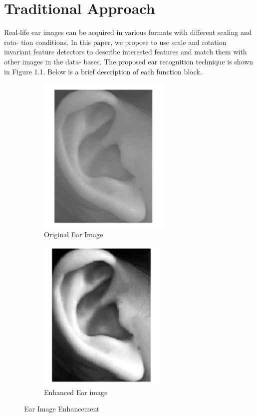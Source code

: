 \section{Traditional Approach} 
Real-life ear images can be acquired in various formats with different scaling and rota- tion conditions. In this paper, we propose to use scale and rotation invariant feature detectors to describe interested features and match them with other images in the data- bases. The proposed ear recognition technique is shown in Figure 1.1. Below is a brief description of each function block.


\begin{figure}
\centering
\begin{subfigure}{.5\textwidth}
  \centering
  \includegraphics[width=.4\linewidth]{Figures/Figure3}
  \caption{Original Ear Image}
  \label{fig:sub1}
\end{subfigure}%
\begin{subfigure}{.5\textwidth}
  \centering
  \includegraphics[width=.4\linewidth]{Figures/Figure4}
  \caption{Enhanced Ear image}
  \label{fig:sub2}
\end{subfigure}
\caption{Ear Image Enhancement}
\label{fig:test1}
\end{figure}


